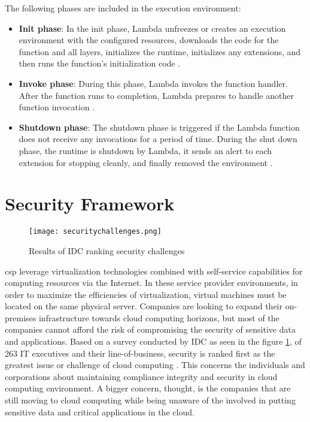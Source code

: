 \par The following phases are included in the execution
environment:
\begin{itemize}
    \item \textbf{Init phase}: In the init phase, Lambda unfreezes or creates an execution environment with the configured
    resources, downloads the code for the function and all layers, initializes the runtime, initializes any
    extensions, and then runs the function’s
    initialization code \cite{46}.
\end{itemize}
\begin{itemize}
    \item \textbf{Invoke phase}: During this phase, Lambda invokes the function handler. After the function runs to
    completion, Lambda prepares to handle another
    function invocation \cite{46}.
\end{itemize}
\begin{itemize}
    \item \textbf{Shutdown phase}: The shutdown phase is triggered if the Lambda function does not receive any invocations
    for a period of time.
    During the shut down  phase, the runtime is shutdown
    by Lambda, it sends an alert to each extension for
    stopping cleanly, and finally removed the environment \cite{46}.
\end{itemize}


\section{Security Framework}

\begin{figure}
    \centering
    \texttt{[image: securitychallenges.png]}
    \caption{Results of IDC ranking security
    challenges}{\cite{47}}
    \label{fig:securitychallenges}
\end{figure}

\par \gls{csp} leverage virtualization technologies combined with self-service capabilities for computing resources via the Internet.
In these service provider environments, in order to maximize the efficiencies of virtualization, virtual machines must be located on the same physical server.
Companies are looking to expand their on-premises
infrastructure towards cloud computing horizons, but most
of the companies cannot afford the risk of compromising the
security of sensitive data and applications.
Based on a survey conducted by IDC as seen in the figure \ref{fig:securitychallenges}, of 263 IT executives and their line-of-business, security is ranked first as the greatest issue or challenge of cloud computing \cite{47}.
This concerns the individuals and corporations about maintaining compliance integrity and security in cloud computing environment.
A bigger concern, thought, is the companies that are
still moving to cloud computing while being unaware of the involved in putting sensitive data and critical applications in the cloud.

